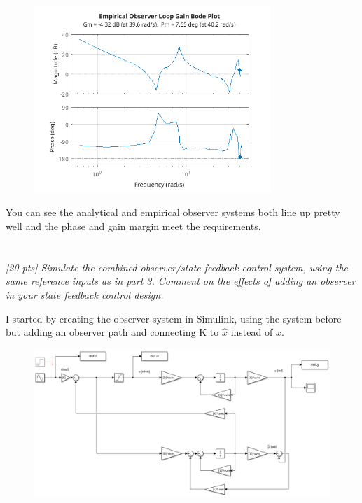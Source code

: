 \documentclass{article}
\begin{document}
\begin{figure}[H]
\centering
\includegraphics[width=0.8\textwidth]{empObsResp.png}
\label{fig:empObsResp}
\end{figure}

You can see the analytical and empirical observer systems both line up pretty well and the phase and gain margin meet the requirements.

\section{}
\textit{[20 pts] Simulate the combined observer/state feedback control system, using the same reference inputs as in part 3. Comment on the effects of adding an observer in your state feedback control design.}

I started by creating the observer system in Simulink, using the system before but adding an observer path and connecting K to $\hat{x}$ instead of $x$.

\begin{figure}[H]
\centering
\includegraphics[width=\textwidth]{obsBlockDiagram.png}
\label{fig:obsBlockDiagram}
\end{figure}
\end{document}
